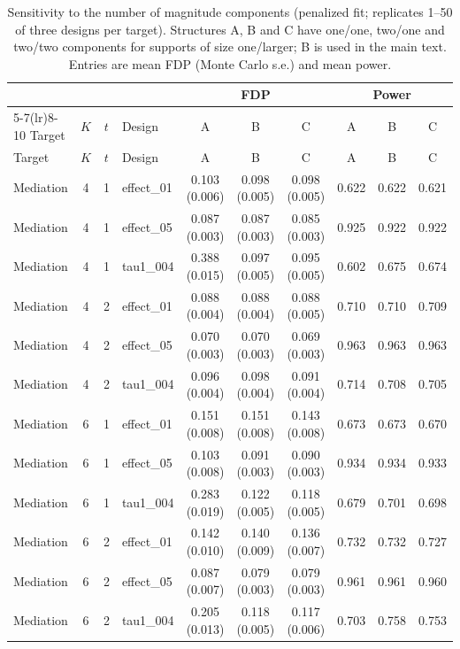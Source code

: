 {\footnotesize\setlength{\tabcolsep}{4pt}
\begin{longtable}{lccl ccc ccc}
\caption{Sensitivity to the number of magnitude components (penalized fit; replicates 1--50 of three designs per target). Structures A, B and C have one/one, two/one and two/two components for supports of size one/larger; B is used in the main text. Entries are mean FDP (Monte Carlo s.e.) and mean power.}\label{tab:structure-sensitivity}\\
\toprule
 & & & & \multicolumn{3}{c}{FDP} & \multicolumn{3}{c}{Power}\\
\cmidrule(lr){5-7}\cmidrule(lr){8-10}
Target & $K$ & $t$ & Design & A & B & C & A & B & C\\
\midrule
\endfirsthead
\toprule
Target & $K$ & $t$ & Design & A & B & C & A & B & C\\
\midrule
\endhead
\bottomrule
\endfoot
Mediation & 4 & 1 & effect\_01 & 0.103 (0.006) & 0.098 (0.005) & 0.098 (0.005) & 0.622 & 0.622 & 0.621\\
Mediation & 4 & 1 & effect\_05 & 0.087 (0.003) & 0.087 (0.003) & 0.085 (0.003) & 0.925 & 0.922 & 0.922\\
Mediation & 4 & 1 & tau1\_004 & 0.388 (0.015) & 0.097 (0.005) & 0.095 (0.005) & 0.602 & 0.675 & 0.674\\
Mediation & 4 & 2 & effect\_01 & 0.088 (0.004) & 0.088 (0.004) & 0.088 (0.005) & 0.710 & 0.710 & 0.709\\
Mediation & 4 & 2 & effect\_05 & 0.070 (0.003) & 0.070 (0.003) & 0.069 (0.003) & 0.963 & 0.963 & 0.963\\
Mediation & 4 & 2 & tau1\_004 & 0.096 (0.004) & 0.098 (0.004) & 0.091 (0.004) & 0.714 & 0.708 & 0.705\\
Mediation & 6 & 1 & effect\_01 & 0.151 (0.008) & 0.151 (0.008) & 0.143 (0.008) & 0.673 & 0.673 & 0.670\\
Mediation & 6 & 1 & effect\_05 & 0.103 (0.008) & 0.091 (0.003) & 0.090 (0.003) & 0.934 & 0.934 & 0.933\\
Mediation & 6 & 1 & tau1\_004 & 0.283 (0.019) & 0.122 (0.005) & 0.118 (0.005) & 0.679 & 0.701 & 0.698\\
Mediation & 6 & 2 & effect\_01 & 0.142 (0.010) & 0.140 (0.009) & 0.136 (0.007) & 0.732 & 0.732 & 0.727\\
Mediation & 6 & 2 & effect\_05 & 0.087 (0.007) & 0.079 (0.003) & 0.079 (0.003) & 0.961 & 0.961 & 0.960\\
Mediation & 6 & 2 & tau1\_004 & 0.205 (0.013) & 0.118 (0.005) & 0.117 (0.006) & 0.703 & 0.758 & 0.753\\

\end{longtable}}
